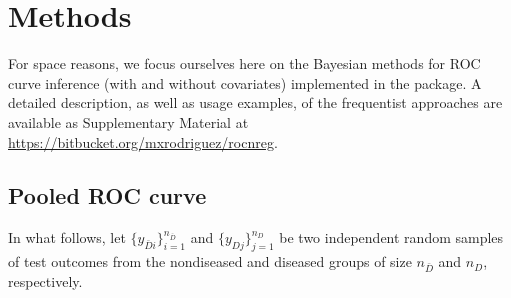 \section{Methods} \label{sec:methods}
For space reasons, we focus ourselves here on the Bayesian methods for ROC curve inference (with and without covariates) implemented in the  package. A detailed description, as well as usage examples, of the frequentist approaches are available as Supplementary Material at \url{https://bitbucket.org/mxrodriguez/rocnreg}.
\subsection{Pooled ROC curve}
In what follows, let $\{y_{\bar{D}i}\}_{i=1}^{n_{\bar{D}}}$ and $\{y_{Dj}\}_{j=1}^{n_D}$ be two independent random samples of test outcomes from the nondiseased and diseased groups of size $n_{\bar{D}}$ and $n_D$, respectively. 
